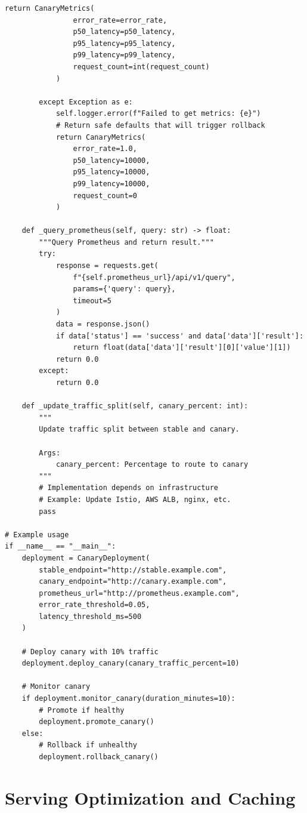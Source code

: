 \begin{lstlisting}[style=python, caption={Canary Deployment Controller}]
            return CanaryMetrics(
                error_rate=error_rate,
                p50_latency=p50_latency,
                p95_latency=p95_latency,
                p99_latency=p99_latency,
                request_count=int(request_count)
            )

        except Exception as e:
            self.logger.error(f"Failed to get metrics: {e}")
            # Return safe defaults that will trigger rollback
            return CanaryMetrics(
                error_rate=1.0,
                p50_latency=10000,
                p95_latency=10000,
                p99_latency=10000,
                request_count=0
            )

    def _query_prometheus(self, query: str) -> float:
        """Query Prometheus and return result."""
        try:
            response = requests.get(
                f"{self.prometheus_url}/api/v1/query",
                params={'query': query},
                timeout=5
            )
            data = response.json()
            if data['status'] == 'success' and data['data']['result']:
                return float(data['data']['result'][0]['value'][1])
            return 0.0
        except:
            return 0.0

    def _update_traffic_split(self, canary_percent: int):
        """
        Update traffic split between stable and canary.

        Args:
            canary_percent: Percentage to route to canary
        """
        # Implementation depends on infrastructure
        # Example: Update Istio, AWS ALB, nginx, etc.
        pass

# Example usage
if __name__ == "__main__":
    deployment = CanaryDeployment(
        stable_endpoint="http://stable.example.com",
        canary_endpoint="http://canary.example.com",
        prometheus_url="http://prometheus.example.com",
        error_rate_threshold=0.05,
        latency_threshold_ms=500
    )

    # Deploy canary with 10% traffic
    deployment.deploy_canary(canary_traffic_percent=10)

    # Monitor canary
    if deployment.monitor_canary(duration_minutes=10):
        # Promote if healthy
        deployment.promote_canary()
    else:
        # Rollback if unhealthy
        deployment.rollback_canary()
\end{lstlisting}

\section{Serving Optimization and Caching}

